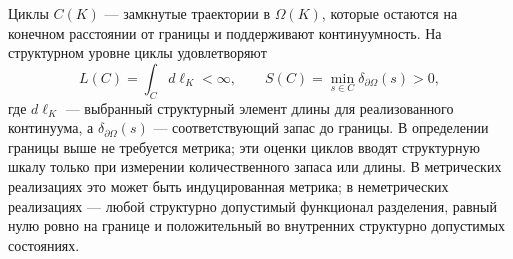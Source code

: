 Циклы \(C(K)\) — замкнутые траектории в \(\Omega(K)\), которые остаются на конечном
расстоянии от границы и поддерживают континуумность.
На структурном уровне циклы удовлетворяют
\[
    L(C) = \int_C d\ell_K < \infty,\qquad
    S(C) = \min_{s \in C} \delta_{\partial\Omega}(s) > 0,
\]
где \(d\ell_K\) — выбранный структурный элемент длины для реализованного континуума,
а \(\delta_{\partial\Omega}(s)\) — соответствующий запас до границы.
В определении границы выше не требуется метрика; эти оценки циклов вводят
структурную шкалу только при измерении количественного запаса или длины.
В метрических реализациях это может быть индуцированная метрика; в неметрических
реализациях — любой структурно допустимый функционал разделения, равный нулю
ровно на границе и положительный во внутренних структурно допустимых состояниях.

